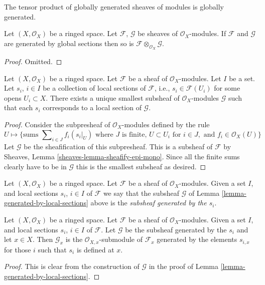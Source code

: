 \begin{lemma}
\label{lemma-tensor-product-globally-generated}
\begin{slogan}
The tensor product of globally generated sheaves of modules is
globally generated.
\end{slogan}
Let $(X, \mathcal{O}_X)$ be a ringed space.
Let $\mathcal{F}$, $\mathcal{G}$ be sheaves of $\mathcal{O}_X$-modules.
If $\mathcal{F}$ and $\mathcal{G}$ are generated by global sections
then so is $\mathcal{F} \otimes_{\mathcal{O}_X} \mathcal{G}$.
\end{lemma}

\begin{proof}
Omitted.
\end{proof}

\begin{lemma}
\label{lemma-generated-by-local-sections}
Let $(X, \mathcal{O}_X)$ be a ringed space.
Let $\mathcal{F}$ be a sheaf of $\mathcal{O}_X$-modules.
Let $I$ be a set. Let $s_i$, $i \in I$ be a collection
of local sections of $\mathcal{F}$, i.e., $s_i \in \mathcal{F}(U_i)$
for some opens $U_i \subset X$. There exists a unique smallest
subsheaf of $\mathcal{O}_X$-modules $\mathcal{G}$ such
that each $s_i$ corresponds to a local section of
$\mathcal{G}$.
\end{lemma}

\begin{proof}
Consider the subpresheaf of $\mathcal{O}_X$-modules
defined by the rule
$$
U
\longmapsto
\{
\text{sums } \sum\nolimits_{i \in J} f_i (s_i|_U)
\text{ where } J \text{ is finite, }
U \subset U_i \text{ for } i\in J, \text{ and }
f_i \in \mathcal{O}_X(U)
\}
$$
Let $\mathcal{G}$ be the sheafification of this subpresheaf.
This is a subsheaf of $\mathcal{F}$ by
Sheaves, Lemma \ref{sheaves-lemma-sheafify-epi-mono}.
Since all the finite sums clearly have to be in $\mathcal{G}$
this is the smallest subsheaf as desired.
\end{proof}

\begin{definition}
\label{definition-generated-by-local-sections}
Let $(X, \mathcal{O}_X)$ be a ringed space.
Let $\mathcal{F}$ be a sheaf of $\mathcal{O}_X$-modules.
Given a set $I$, and
local sections $s_i$, $i \in I$ of $\mathcal{F}$
we say that the subsheaf $\mathcal{G}$ of
Lemma \ref{lemma-generated-by-local-sections}
above is the {\it subsheaf generated by the $s_i$}.
\end{definition}

\begin{lemma}
\label{lemma-generated-by-local-sections-stalk}
Let $(X, \mathcal{O}_X)$ be a ringed space.
Let $\mathcal{F}$ be a sheaf of $\mathcal{O}_X$-modules.
Given a set $I$, and
local sections $s_i$, $i \in I$ of $\mathcal{F}$.
Let $\mathcal{G}$ be the subsheaf generated by the
$s_i$ and let $x\in X$.
Then $\mathcal{G}_x$ is the $\mathcal{O}_{X, x}$-submodule of
$\mathcal{F}_x$ generated by the elements $s_{i, x}$
for those $i$ such that $s_i$ is defined at $x$.
\end{lemma}

\begin{proof}
This is clear from the construction of $\mathcal{G}$
in the proof of Lemma \ref{lemma-generated-by-local-sections}.
\end{proof}











